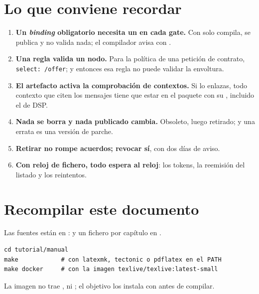 \section{Lo que conviene recordar}

\begin{enumerate}[leftmargin=*, itemsep=3pt]
  \item \textbf{Un \emph{binding} obligatorio necesita un  en cada gate.} Con solo 
        compila, se publica y no valida nada; el compilador avisa con .
  \item \textbf{Una regla valida un nodo.} Para la política de una petición de contrato, \texttt{select: /\allowbreak{}offer}; y
        entonces esa regla no puede validar la envoltura.
  \item \textbf{El artefacto  activa la comprobación de contextos.} Si lo enlazas, todo contexto que
        citen los mensajes tiene que estar en el paquete con su , incluido el de DSP.
  \item \textbf{Nada se borra y nada publicado cambia.} Obsoleto, luego retirado; y una errata es una versión
        de parche.
  \item \textbf{Retirar no rompe acuerdos; revocar sí}, con dos días de aviso.
  \item \textbf{Con reloj de fichero, todo espera al reloj}: los tokens, la reemisión del listado y los
        reintentos.
\end{enumerate}

\section{Recompilar este documento}

Las fuentes están en :  y un fichero por capítulo en .

\begin{lstlisting}[style=sh]
cd tutorial/manual
make            # con latexmk, tectonic o pdflatex en el PATH
make docker     # con la imagen texlive/texlive:latest-small
\end{lstlisting}

La imagen  no trae ,  ni ; el objetivo 
los instala con  antes de compilar.
